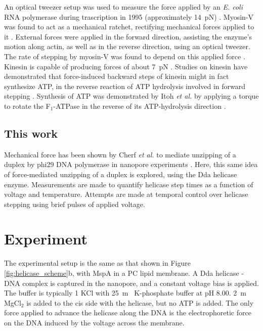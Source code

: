 An optical tweezer setup was used to measure the force applied by an \textit{E. coli} RNA polymerase during trascription in 1995 (approximately \SI{14}{\pico\N}) \citep{Yin1995}.  Myosin-V was found to act as a mechanical ratchet, rectifying mechanical forces applied to it \citep{Gebhardt2006}.  External forces were applied in the forward direction, assisting the enzyme's motion along actin, as well as in the reverse direction, using an optical tweezer.  The rate of stepping by myosin-V was found to depend on this applied force \citep{Clemen2005}.  Kinesin is capable of producing forces of about \SI{7}{\pico\N} \citep{Higuchi1997}.  Studies on kinesin have demonstrated that force-induced backward steps of kinesin might in fact synthesize ATP, in the reverse reaction of ATP hydrolysis involved in forward stepping \citep{Hyeon2009}.  Synthesis of ATP was demonstrated by Itoh \textit{et al.} by applying a torque to rotate the F$_1$-ATPase in the reverse of its ATP-hydrolysis direction \citep{Itoh2004}.

\subsection{This work}

Mechanical force has been shown by Cherf \textit{et al.} to mediate unzipping of a duplex by phi29 DNA polymerase in nanopore experiments \citep{Cherf2012}.  Here, this same idea of force-mediated unzipping of a duplex is explored, using the Dda helicase enzyme.  Measurements are made to quantify helicase step times as a function of voltage and temperature.  Attempts are made at temporal control over helicase stepping using brief pulses of applied voltage.


\section{Experiment}

The experimental setup is the same as that shown in Figure \ref{fig:helicase_scheme}b, with MspA in a PC lipid membrane.  A Dda helicase - DNA complex is captured in the nanopore, and a constant voltage bias is applied.  The buffer is typically \SI{1}{\Molar} KCl with \SI{25}{\m\Molar} K-phosphate buffer at pH \num{8.00}.  \SI{2}{\m\Molar} MgCl$_2$ is added to the cis side with the helicase, but no ATP is added.  The only force applied to advance the helicase along the DNA is the electrophoretic force on the DNA induced by the voltage across the membrane.

